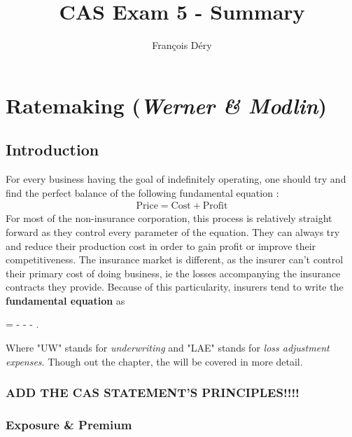 \documentclass[11pt, english]{memoir}
\numberwithin{definition}{section}
\begin{document}
	
	\title{\normalfont\textbf{CAS Exam 5 - Summary}}
	\author{François Déry}
	\date{}
	\maketitle
	
	{\color{black}\tableofcontents}
	
	
	\part{Ratemaking (\emph{Werner \& Modlin})}
	\chapter{Introduction}
	For every business having the goal of indefinitely operating, one should try and find the perfect balance of the following fundamental equation : 
	\begin{align*}
	\text{Price} = \text{Cost} + \text{Profit}
	\end{align*}
	For most of the non-insurance corporation, this process is relatively straight forward as they control every parameter of the equation. They can always try and reduce their production cost in order to gain profit or improve their competitiveness. The insurance market is different, as the insurer can't control their primary cost of doing business, ie the losses accompanying the insurance contracts they provide. Because of this particularity, insurers tend to write the \textbf{fundamental equation} as 
	\begin{tcolorbox}
		 =  -  -  - .
	\end{tcolorbox}
	Where "UW" stands for \emph{underwriting} and "LAE" stands for \emph{loss adjustment expenses}. Though out the chapter, the will be covered in more detail. 
	
	
	\section{ADD THE CAS STATEMENT'S PRINCIPLES!!!!}
	
	
	\section{Exposure \& Premium}
	
\end{document}
